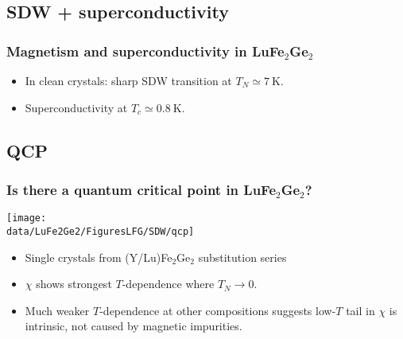 \subsection{SDW + superconductivity}
\begin{frame}[label=LFGAnomalies]
\frametitle{Magnetism and superconductivity in LuFe$_2$Ge$_2$}
\centerline{}

\begin{itemize}
\item <1-> In clean crystals: sharp SDW transition at $T_N \simeq \SI{7}{\kelvin}$.
\item <2-> Superconductivity at $T_c \simeq \SI{0.8}{\kelvin}$.
\end{itemize}
\end{frame}

\subsection{QCP}
\begin{frame}[label=QCP]
\frametitle{Is there a quantum critical point in LuFe$_2$Ge$_2$?}
\centerline{\texttt{[image: \\data/LuFe2Ge2/FiguresLFG/SDW/qcp]}}

\begin{itemize}
\item
Single crystals from (Y/Lu)Fe$_2$Ge$_2$ substitution series
\item
$\chi$ shows strongest $T$-dependence where $T_N \rightarrow 0$.
\item
Much weaker $T$-dependence at other compositions suggests low-$T$ tail in $\chi$ is intrinsic, not caused by magnetic impurities.
\end{itemize}
\end{frame}


